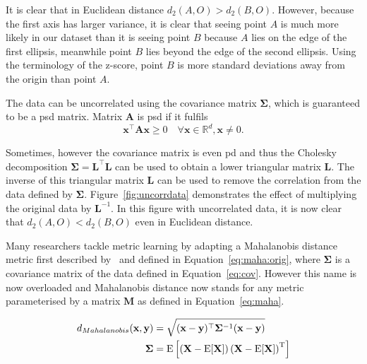 \documentclass[12pt,a4paper]{report}
\begin{document}
It is clear that in Euclidean distance $d_2(A,O)>d_2(B,O)$. However, because the first axis has larger variance, it is clear that seeing point $A$ is much more likely in our dataset than it is seeing point $B$ because $A$ lies on the edge of the first ellipsis, meanwhile point $B$ lies beyond the edge of the second ellipsis. Using the terminology of the z-score, point $B$ is more standard deviations away from the origin than point $A$.

The data can be uncorrelated using the covariance matrix $\bm{\Sigma}$, which is guaranteed to be a \ac{psd} matrix. Matrix $\bm{A}$ is \ac{psd} if it fulfils
\begin{equation*}
\bm{x}^\top \bm{A}\bm{x} \geq 0 \quad \forall \bm{x} \in \mathbb{R}^d, \bm{x} \neq 0.
\end{equation*}

Sometimes, however the covariance matrix is even \ac{pd} and thus the Cholesky decomposition $\bm{\Sigma}=\bm{L}^\top\bm{L}$ can be used to obtain a lower triangular matrix $\bm{L}$. The inverse of this triangular matrix $\bm{L}$ can be used to remove the correlation from the data defined by $\bm{\Sigma}$. Figure~\ref{fig:uncorrdata} demonstrates the effect of multiplying the original data by $\bm{L}^{-1}$. In this figure with uncorrelated data, it is now clear that $d_2(A,O)<d_2(B,O)$ even in Euclidean distance.


Many researchers tackle metric learning by adapting a Mahalanobis distance metric first described by~\citep{mahalanobis1936generalized} and defined in Equation~\ref{eq:maha:orig}, where $\bm{\Sigma}$ is a covariance matrix of the data defined in Equation~\ref{eq:cov}. However this name is now overloaded and Mahalanobis distance now stands for any metric parameterised by a matrix $\bm{M}$ as defined in Equation~\ref{eq:maha}.

\begin{align} \label{eq:maha:orig}
d_{Mahalanobis}(\textbf{x},\textbf{y}) &= \sqrt{(\textbf{x}-\textbf{y})^\top\bm{\Sigma}^{-1}(\textbf{x}-\textbf{y})}  \\
\bm{\Sigma} &= \mathrm {E} \left[\left(\mathbf {X} -\mathrm {E} [\mathbf {X} ]\right)\left(\mathbf {X} -\mathrm {E} [\mathbf {X} ]\right)^{\rm {T}}\right] \label{eq:cov}
\end{align}
\end{document}
